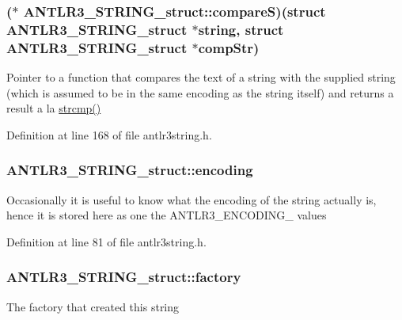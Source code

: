 \hypertarget{struct_a_n_t_l_r3___s_t_r_i_n_g__struct_a5904beec2286c167a63ac20592a121cb}{
\subsubsection[{compare\-S}]{($\ast$ A\-N\-T\-L\-R3\-\_\-\-S\-T\-R\-I\-N\-G\-\_\-struct\-::compare\-S)(struct {\bf A\-N\-T\-L\-R3\-\_\-\-S\-T\-R\-I\-N\-G\-\_\-struct} $\ast$string, struct {\bf A\-N\-T\-L\-R3\-\_\-\-S\-T\-R\-I\-N\-G\-\_\-struct} $\ast$comp\-Str)}}\label{struct_a_n_t_l_r3___s_t_r_i_n_g__struct_a5904beec2286c167a63ac20592a121cb}
Pointer to a function that compares the text of a string with the supplied string (which is assumed to be in the same encoding as the string itself) and returns a result a la \hyperlink{qmb_8m_acb0bf34e5a38d0484b1e3e24b8106f52}{strcmp()} 

Definition at line 168 of file antlr3string.\-h.

\hypertarget{struct_a_n_t_l_r3___s_t_r_i_n_g__struct_adde88a6f0bf0ad113853474510300c55}{
\subsubsection[{encoding}]{ A\-N\-T\-L\-R3\-\_\-\-S\-T\-R\-I\-N\-G\-\_\-struct\-::encoding}}\label{struct_a_n_t_l_r3___s_t_r_i_n_g__struct_adde88a6f0bf0ad113853474510300c55}
Occasionally it is useful to know what the encoding of the string actually is, hence it is stored here as one the A\-N\-T\-L\-R3\-\_\-\-E\-N\-C\-O\-D\-I\-N\-G\-\_\- values 

Definition at line 81 of file antlr3string.\-h.

\hypertarget{struct_a_n_t_l_r3___s_t_r_i_n_g__struct_abb0b2baef8956c33f1c5745ab6c6b7a7}{
\subsubsection[{factory}]{ A\-N\-T\-L\-R3\-\_\-\-S\-T\-R\-I\-N\-G\-\_\-struct\-::factory}}\label{struct_a_n_t_l_r3___s_t_r_i_n_g__struct_abb0b2baef8956c33f1c5745ab6c6b7a7}
The factory that created this string 

